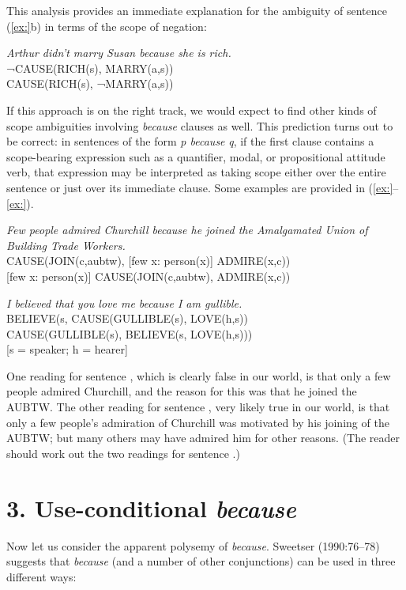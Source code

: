 This analysis provides an immediate explanation for the ambiguity of sentence (\ref{ex:}b) in terms of the scope of negation:


\ea
  \textit{Arthur didn’t marry Susan because she is rich.}\\
\ea ¬CAUSE(RICH(s), MARRY(a,s))\\
\ex CAUSE(RICH(s), ¬MARRY(a,s))
                       \z
\z


If this approach is on the right track, we would expect to find other kinds of scope ambiguities involving \textit{because} clauses as well. This prediction turns out to be correct: in sentences of the form \textit{p because} \textit{q}, if the first clause contains a scope-bearing expression such as a quantifier, modal, or propositional attitude verb, that expression may be interpreted as taking scope either over the entire sentence or just over its immediate clause. Some examples are provided in (\ref{ex:}--\ref{ex:}).


\ea
\textit{Few people admired Churchill because he joined the Amalgamated Union of Building Trade Workers.}\\
\ea CAUSE(JOIN(c,aubtw), [few x: person(x)] ADMIRE(x,c))\\
\ex{} [few x: person(x)] CAUSE(JOIN(c,aubtw), ADMIRE(x,c))
                       \z
\z

\ea
\textit{I believed that you love me because I am gullible.}\\
\ea BELIEVE(s, CAUSE(GULLIBLE(s), LOVE(h,s))\\
\ex CAUSE(GULLIBLE(s), BELIEVE(s, LOVE(h,s)))\\
    {}[s = speaker; h = hearer]
                       \z
\z


One reading for sentence , which is clearly false in our world, is that only a few people admired Churchill, and the reason for this was that he joined the AUBTW. The other reading for sentence , very likely true in our world, is that only a few people’s admiration of Churchill was motivated by his joining of the AUBTW; but many others may have admired him for other reasons. (The reader should work out the two readings for sentence .)


\section{3. Use-conditional \textit{because}}\label{sec:}

Now let us consider the apparent polysemy of \textit{because}. Sweetser (1990:76–78) suggests that \textit{because} (and a number of other conjunctions) can be used in three different ways: 


